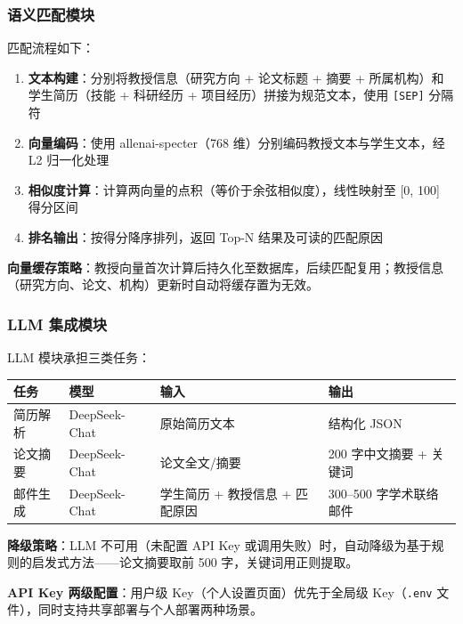 \documentclass[11pt]{article}
\begin{document}
\subsubsection{语义匹配模块}

匹配流程如下：

\begin{enumerate}
    \item \textbf{文本构建}：分别将教授信息（研究方向 + 论文标题 + 摘要 + 所属机构）和学生简历（技能 + 科研经历 + 项目经历）拼接为规范文本，使用 \texttt{[SEP]} 分隔符
    \item \textbf{向量编码}：使用 allenai-specter（768 维）分别编码教授文本与学生文本，经 L2 归一化处理
    \item \textbf{相似度计算}：计算两向量的点积（等价于余弦相似度），线性映射至 [0, 100] 得分区间
    \item \textbf{排名输出}：按得分降序排列，返回 Top-N 结果及可读的匹配原因
\end{enumerate}

\textbf{向量缓存策略}：教授向量首次计算后持久化至数据库，后续匹配复用；教授信息（研究方向、论文、机构）更新时自动将缓存置为无效。

\subsubsection{LLM 集成模块}

LLM 模块承担三类任务：

\begin{center}
\small
\begin{tabular}{|l|l|p{3cm}|p{3.5cm}|}
\hline
\textbf{任务} & \textbf{模型} & \textbf{输入} & \textbf{输出} \\
\hline
简历解析 & DeepSeek-Chat & 原始简历文本 & 结构化 JSON \\
论文摘要 & DeepSeek-Chat & 论文全文/摘要 & 200 字中文摘要 + 关键词 \\
邮件生成 & DeepSeek-Chat & 学生简历 + 教授信息 + 匹配原因 & 300--500 字学术联络邮件 \\
\hline
\end{tabular}
\end{center}

\textbf{降级策略}：LLM 不可用（未配置 API Key 或调用失败）时，自动降级为基于规则的启发式方法——论文摘要取前 500 字，关键词用正则提取。

\textbf{API Key 两级配置}：用户级 Key（个人设置页面）优先于全局级 Key（\texttt{.env} 文件），同时支持共享部署与个人部署两种场景。
\end{document}
